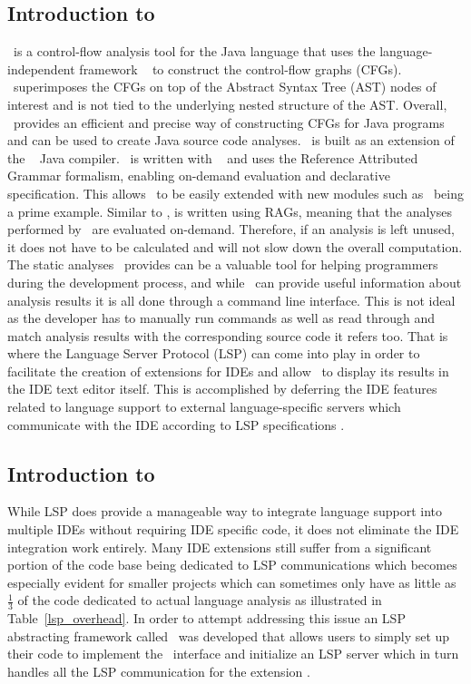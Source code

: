 \documentclass[sigplan,10pt]{acmart}
\begin{document}
\subsection{Introduction to \intraj}
\intraj\ is a control-flow analysis tool for the Java language that uses the language-independent framework \intracfg~\cite{intraj} to construct the control-flow graphs (CFGs). \intraj\ superimposes the CFGs on top of the Abstract Syntax Tree (AST) nodes of interest and is not tied to the underlying nested structure of the AST. Overall, \intraj\ provides an efficient and precise way of constructing CFGs for Java programs and can be used to create Java source code analyses. \intraj\ is built as an extension of the \extendj\ \cite{extendj} Java compiler. \extendj\ is written with \jastadd~\cite{jastadd} and uses the Reference Attributed Grammar formalism, enabling on-demand evaluation and declarative specification. This allows \extendj\ to be easily extended with new modules such as \intraj\ being a prime example. Similar to \extendj, \intraj is written using RAGs, meaning that the  analyses performed by \intraj\ are evaluated on-demand. Therefore, if an analysis is left unused, it does not have to be calculated and will not slow down the overall computation.\\ 
The static analyses \intraj\ provides can be a valuable tool for helping programmers during the development process, and while \intraj\ can provide useful information about analysis results it is all done through a command line interface. This is not ideal as the developer has to manually run commands as well as read through and match analysis results with the corresponding source code it refers too. That is where the Language Server Protocol (LSP) can come into play in order to facilitate the creation of extensions for IDEs and allow \intraj\ to display its results in the IDE text editor itself. This is accomplished by deferring the IDE features related to language support to external language-specific servers which communicate with the IDE according to LSP specifications \cite{lsp}.

\subsection{Introduction to \magpie}
While LSP does provide a manageable way to integrate language support into multiple IDEs without requiring IDE specific code, it does not eliminate the IDE integration work entirely. Many IDE extensions still suffer from a significant portion of the code base being dedicated to LSP communications which becomes especially evident for smaller projects which can sometimes only have as little as $\frac{1}{3}$ of the code dedicated to actual language analysis as illustrated in Table~\ref{lsp_overhead}. In order to attempt addressing this issue an LSP abstracting framework called \magpie\ was developed that allows users to simply set up their code to implement the \magpie\ interface and initialize an LSP server which in turn handles all the LSP communication for the extension \cite{magpie}.
\end{document}
